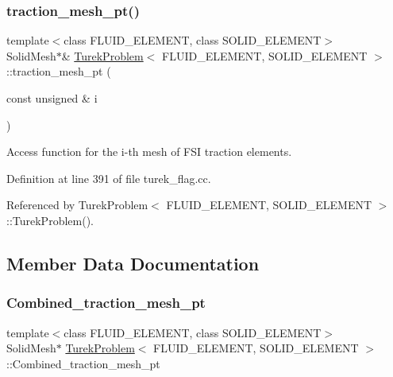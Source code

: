 \mbox{\label{classTurekProblem_a93a4b3d4e598a499631e00cfa701ee3c}} 
\subsubsection{\texorpdfstring{traction\+\_\+mesh\+\_\+pt()}{traction\_mesh\_pt()}}
{\footnotesize\ttfamily template$<$class F\+L\+U\+I\+D\+\_\+\+E\+L\+E\+M\+E\+NT, class S\+O\+L\+I\+D\+\_\+\+E\+L\+E\+M\+E\+NT$>$ \\
Solid\+Mesh$\ast$\& \hyperlink{classTurekProblem}{Turek\+Problem}$<$ F\+L\+U\+I\+D\+\_\+\+E\+L\+E\+M\+E\+NT, S\+O\+L\+I\+D\+\_\+\+E\+L\+E\+M\+E\+NT $>$\+::traction\+\_\+mesh\+\_\+pt (\begin{DoxyParamCaption}\item[{const unsigned \&}]{i }\end{DoxyParamCaption})\hspace{0.3cm}{\ttfamily [inline]}}



Access function for the i-\/th mesh of F\+SI traction elements. 



Definition at line 391 of file turek\+\_\+flag.\+cc.



Referenced by Turek\+Problem$<$ F\+L\+U\+I\+D\+\_\+\+E\+L\+E\+M\+E\+N\+T, S\+O\+L\+I\+D\+\_\+\+E\+L\+E\+M\+E\+N\+T $>$\+::\+Turek\+Problem().



\subsection{Member Data Documentation}
\mbox{\label{classTurekProblem_ac61477b19dfaaba6fb2c7a5c72240ac6}} 
\subsubsection{\texorpdfstring{Combined\+\_\+traction\+\_\+mesh\+\_\+pt}{Combined\_traction\_mesh\_pt}}
{\footnotesize\ttfamily template$<$class F\+L\+U\+I\+D\+\_\+\+E\+L\+E\+M\+E\+NT, class S\+O\+L\+I\+D\+\_\+\+E\+L\+E\+M\+E\+NT$>$ \\
Solid\+Mesh$\ast$ \hyperlink{classTurekProblem}{Turek\+Problem}$<$ F\+L\+U\+I\+D\+\_\+\+E\+L\+E\+M\+E\+NT, S\+O\+L\+I\+D\+\_\+\+E\+L\+E\+M\+E\+NT $>$\+::Combined\+\_\+traction\+\_\+mesh\+\_\+pt\hspace{0.3cm}{\ttfamily [private]}}




